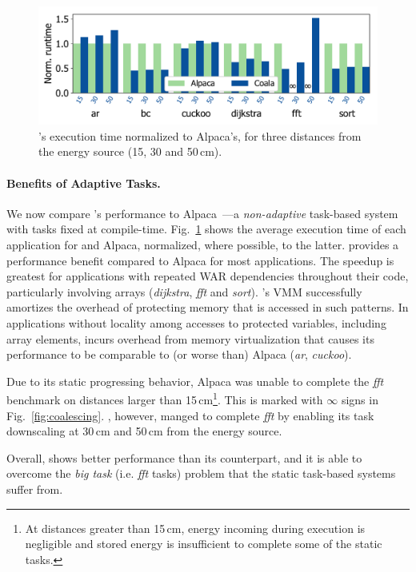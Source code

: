 \begin{figure}
    \includegraphics[width=.8\columnwidth]{figures/coala_alpaca_gcc}
    \caption{\sys's execution time normalized to Alpaca's,
    for three distances from the energy source (15, 30 and 50\,cm).}
    \label{fig:runtime}
\end{figure}

\paragraph{Benefits of Adaptive Tasks.}
%
We now compare \sys's performance to Alpaca~\cite{alpaca}---a
\emph{non-adaptive} task-based system with tasks fixed at compile-time.
Fig.~\ref{fig:runtime} shows the average execution time of each
application for \sys and Alpaca, normalized, where possible, to the latter.
\sys provides a performance benefit compared to Alpaca for most
applications. The speedup is greatest for applications with repeated WAR
dependencies throughout their code, particularly involving arrays
(\textit{dijkstra}, \textit{fft} and \textit{sort}). \sys's VMM
successfully amortizes the overhead of protecting memory that is accessed in
such patterns.  In applications without locality among accesses to protected
variables, including array elements, \sys incurs overhead from memory
virtualization that causes its performance to be comparable to (or worse than)
Alpaca (\textit{ar}, \textit{cuckoo}).

Due to its static progressing behavior, Alpaca was unable to complete the \textit{fft} benchmark on distances larger than 15\,cm\footnote{At distances greater than 15\,cm, energy incoming during
execution is negligible and stored energy is insufficient to complete some of
the static tasks.}. This is marked with $\infty$ signs in Fig.~\ref{fig:coalescing}. \sys, however, manged to complete \textit{fft} by enabling its task downscaling at 30\,cm and 50\,cm from the energy source.
 
Overall, \sys shows better performance than its counterpart, and it is able to overcome the \textit{big task} (i.e. \textit{fft} tasks) problem that the static task-based systems suffer from. 

